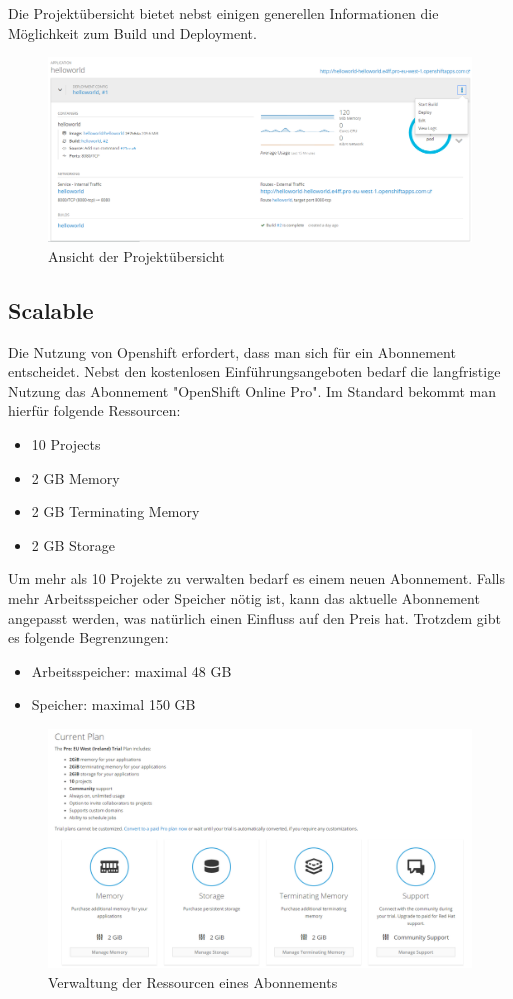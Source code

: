 \documentclass[12pt,a4paper]{article}
\begin{document}
Die Projektübersicht bietet nebst einigen generellen Informationen die Möglichkeit zum Build und Deployment.

\begin{figure}[h]
	\centering
	\includegraphics[width=0.7\linewidth]{img/os-project-overview}
	\caption{Ansicht der Projektübersicht}
	\label{fig:os-project-overview}
\end{figure}

\subsection{Scalable}

Die Nutzung von Openshift erfordert, dass man sich für ein Abonnement entscheidet. Nebst den kostenlosen Einführungsangeboten bedarf die langfristige Nutzung das Abonnement "OpenShift Online Pro". Im Standard bekommt man hierfür folgende Ressourcen:

\begin{itemize}
	\item 10 Projects
	\item 2 GB Memory
	\item 2 GB Terminating Memory
	\item 2 GB Storage
\end{itemize}

Um mehr als 10 Projekte zu verwalten bedarf es einem neuen Abonnement. Falls mehr Arbeitsspeicher oder Speicher nötig ist, kann das aktuelle Abonnement angepasst werden, was natürlich einen Einfluss auf den Preis hat. Trotzdem gibt es folgende Begrenzungen:

\begin{itemize}
	\item Arbeitsspeicher: maximal 48 GB
	\item Speicher: maximal 150 GB
\end{itemize}

\begin{figure}[h]
	\centering
	\includegraphics[width=0.7\linewidth]{img/os-scalability}
	\caption{Verwaltung der Ressourcen eines Abonnements}
	\label{fig:os-scalability}
\end{figure}
\end{document}
